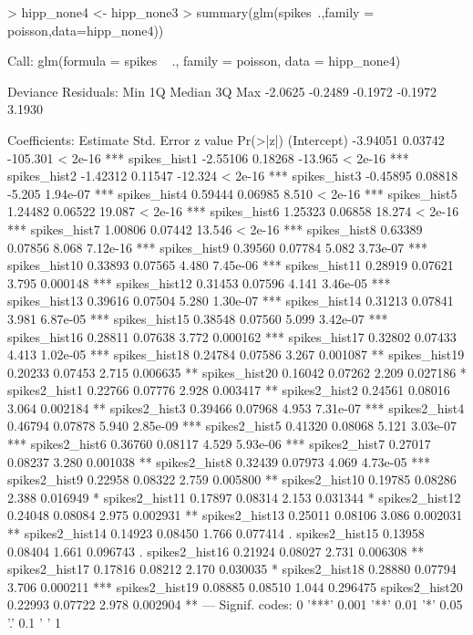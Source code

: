 \documentclass[a4paper]{article}
\begin{document}
\begin{Schunk}
\begin{Sinput}
> hipp_none4 <- hipp_none3 %>% select(-xN,-yN,-xN2,-yN2)
> summary(glm(spikes~.,family = poisson,data=hipp_none4))
\end{Sinput}
\begin{Soutput}
Call:
glm(formula = spikes ~ ., family = poisson, data = hipp_none4)

Deviance Residuals: 
    Min       1Q   Median       3Q      Max  
-2.0625  -0.2489  -0.1972  -0.1972   3.1930  

Coefficients:
               Estimate Std. Error  z value Pr(>|z|)    
(Intercept)    -3.94051    0.03742 -105.301  < 2e-16 ***
spikes_hist1   -2.55106    0.18268  -13.965  < 2e-16 ***
spikes_hist2   -1.42312    0.11547  -12.324  < 2e-16 ***
spikes_hist3   -0.45895    0.08818   -5.205 1.94e-07 ***
spikes_hist4    0.59444    0.06985    8.510  < 2e-16 ***
spikes_hist5    1.24482    0.06522   19.087  < 2e-16 ***
spikes_hist6    1.25323    0.06858   18.274  < 2e-16 ***
spikes_hist7    1.00806    0.07442   13.546  < 2e-16 ***
spikes_hist8    0.63389    0.07856    8.068 7.12e-16 ***
spikes_hist9    0.39560    0.07784    5.082 3.73e-07 ***
spikes_hist10   0.33893    0.07565    4.480 7.45e-06 ***
spikes_hist11   0.28919    0.07621    3.795 0.000148 ***
spikes_hist12   0.31453    0.07596    4.141 3.46e-05 ***
spikes_hist13   0.39616    0.07504    5.280 1.30e-07 ***
spikes_hist14   0.31213    0.07841    3.981 6.87e-05 ***
spikes_hist15   0.38548    0.07560    5.099 3.42e-07 ***
spikes_hist16   0.28811    0.07638    3.772 0.000162 ***
spikes_hist17   0.32802    0.07433    4.413 1.02e-05 ***
spikes_hist18   0.24784    0.07586    3.267 0.001087 ** 
spikes_hist19   0.20233    0.07453    2.715 0.006635 ** 
spikes_hist20   0.16042    0.07262    2.209 0.027186 *  
spikes2_hist1   0.22766    0.07776    2.928 0.003417 ** 
spikes2_hist2   0.24561    0.08016    3.064 0.002184 ** 
spikes2_hist3   0.39466    0.07968    4.953 7.31e-07 ***
spikes2_hist4   0.46794    0.07878    5.940 2.85e-09 ***
spikes2_hist5   0.41320    0.08068    5.121 3.03e-07 ***
spikes2_hist6   0.36760    0.08117    4.529 5.93e-06 ***
spikes2_hist7   0.27017    0.08237    3.280 0.001038 ** 
spikes2_hist8   0.32439    0.07973    4.069 4.73e-05 ***
spikes2_hist9   0.22958    0.08322    2.759 0.005800 ** 
spikes2_hist10  0.19785    0.08286    2.388 0.016949 *  
spikes2_hist11  0.17897    0.08314    2.153 0.031344 *  
spikes2_hist12  0.24048    0.08084    2.975 0.002931 ** 
spikes2_hist13  0.25011    0.08106    3.086 0.002031 ** 
spikes2_hist14  0.14923    0.08450    1.766 0.077414 .  
spikes2_hist15  0.13958    0.08404    1.661 0.096743 .  
spikes2_hist16  0.21924    0.08027    2.731 0.006308 ** 
spikes2_hist17  0.17816    0.08212    2.170 0.030035 *  
spikes2_hist18  0.28880    0.07794    3.706 0.000211 ***
spikes2_hist19  0.08885    0.08510    1.044 0.296475    
spikes2_hist20  0.22993    0.07722    2.978 0.002904 ** 
---
Signif. codes:  0 '***' 0.001 '**' 0.01 '*' 0.05 '.' 0.1 ' ' 1


\end{Soutput}
\end{Schunk}
\end{document}

